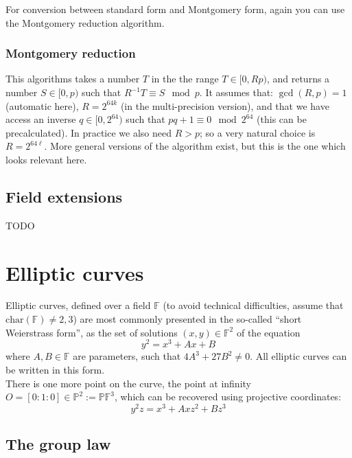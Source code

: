\documentclass[12pt,draft,a4paper,openany,oneside]{amsbook}
\def\F{\mathbb{F}}
\def\P{\mathbb{P}}
\theoremstyle{plain}
\theoremstyle{definition}
\begin{document}
For conversion between standard form and Montgomery form, again you can use
the Montgomery reduction algorithm.\\

\subsection{Montgomery reduction}
This algorithms takes a number $T$ in the the range $T\in[0,Rp)$, and returns
a number $S\in[0,p)$ such that $R^{-1}T\equiv S \mod p$. It assumes that:
$\gcd(R,p)=1$ (automatic here), $R=2^{64k}$ (in the multi-precision version), and that we have access
an inverse $q\in[0,2^{64})$ such that $pq + 1 \equiv 0\mod 2^{64}$ (this can be precalculated).
In practice we also need $R>p$; so a very natural choice is $R=2^{64\ell}$.
More general versions of the algorithm exist, but this is the one which looks
relevant here.


\section{Field extensions}

TODO


\chapter{Elliptic curves}

Elliptic curves, defined over a field $\F$ (to avoid technical difficulties, assume that $\mathrm{char}(\F)\neq 2,3$)
are most commonly presented in the so-called ``short Weierstrass form'',
as the set of solutions $(x,y)\in\F^2$ of the equation
\[ y^2 = x^3 + Ax + B \]
where $A,B\in\F$ are parameters, such that $4 A^3 + 27 B^2 \neq 0$. 
All elliptic curves can be written in this form.\\

There is one more point on the curve, the point at infinity $O=[0:1:0]\in\P^2:=\P\F^3$,
which can be recovered using projective coordinates:
\[ y^2z = x^3 + Axz^2 + Bz^3 \]

\section{The group law}
\end{document}

